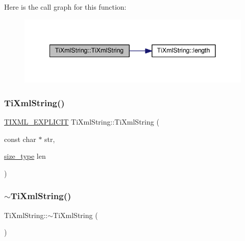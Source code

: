 Here is the call graph for this function\+:\nopagebreak
\begin{figure}[H]
\begin{center}
\leavevmode
\includegraphics[width=341pt]{class_ti_xml_string_aa3b32bd2891a757c9f36c21db44c81d2_cgraph}
\end{center}
\end{figure}
\mbox{\label{class_ti_xml_string_a4b17ea5c5db986f14827223dfa8f1547}} 
\subsubsection{\texorpdfstring{Ti\+Xml\+String()}{TiXmlString()}\hspace{0.1cm}{\footnotesize\ttfamily [4/4]}}
{\footnotesize\ttfamily \hyperlink{tinystr_8h_ae341476cd6b94ee32e3e93110a759581}{T\+I\+X\+M\+L\+\_\+\+E\+X\+P\+L\+I\+C\+IT} Ti\+Xml\+String\+::\+Ti\+Xml\+String (\begin{DoxyParamCaption}\item[{const char $\ast$}]{str,  }\item[{\hyperlink{class_ti_xml_string_abeb2c1893a04c17904f7c06546d0b971}{size\+\_\+type}}]{len }\end{DoxyParamCaption})\hspace{0.3cm}{\ttfamily [inline]}}

\mbox{\label{class_ti_xml_string_a7ac03f581ca3422c4808162ab14f3450}} 
\subsubsection{\texorpdfstring{$\sim$\+Ti\+Xml\+String()}{~TiXmlString()}}
{\footnotesize\ttfamily Ti\+Xml\+String\+::$\sim$\+Ti\+Xml\+String (\begin{DoxyParamCaption}{ }\end{DoxyParamCaption})\hspace{0.3cm}{\ttfamily [inline]}}



